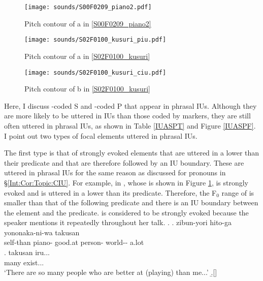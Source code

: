 \begin{figure}
	\begin{center}
	\texttt{[image: sounds/S00F0209\_piano2.pdf]}
	\caption{Pitch contour of a in \ref{S00F0209_piano2}}
	\label{S00F0209_piano2F}
	\end{center}
\end{figure}
\begin{figure}
	\begin{center}
	\texttt{[image: sounds/S02F0100\_kusuri\_piu.pdf]}
	\caption{Pitch contour of a in \ref{S02F0100_kusuri}}
	\label{S02F0100_kusuri_piuF}
	\end{center}
\end{figure}
\begin{figure}
	\begin{center}
	\texttt{[image: sounds/S02F0100\_kusuri\_ciu.pdf]}
	\caption{Pitch contour of b in \ref{S02F0100_kusuri}}
	\label{S02F0100_kusuri_ciuF}
	\end{center}
\end{figure}

Here, I discuss -coded S and -coded P that
appear in phrasal IUs.
Although they are more likely to be uttered in  IUs than 
those coded by  markers,
they are still often uttered in phrasal IUs,
as shown in Table \ref{IUASPT} and Figure \ref{IUASPF}.
I point out two types of focal elements uttered in phrasal IUs.

The first type is that of strongly evoked elements that are uttered in a lower  than their predicate and that are therefore followed by an IU boundary.
These are uttered in phrasal IUs for the same reason as discussed for pronouns in \S \ref{Int:Cor:Topic:CIU}.
For example, in \Next, whose  is shown in Figure \ref{S00F0209_piano2F},
 is strongly evoked and is uttered in a lower  than its predicate.
Therefore, the F$_{0}$ range of  is smaller than that of the following predicate and there is an IU boundary between the element  and the predicate.
 is considered to be strongly evoked
because the speaker mentions it repeatedly throughout her talk.
%
\largerpage
\ex.\label{S00F0209_piano2}
 \ag. zibun-yori  \tp{\dvline}  hito-ga yononaka-ni-wa takusan~\tp{\dvline}\hspace*{-4mm} \\
          self-than piano- {} good.at person- world-- a.lot {} \\
 \bg. takusan iru... \\
      many exist... \\
      `There are so many people who are better at (playing)  than me...'
 \b.[] 

